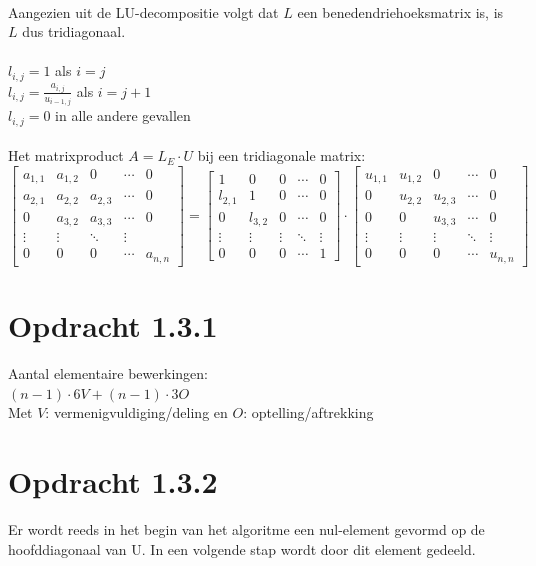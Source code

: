 \documentclass[a4paper]{article}
\begin{document}
\\Aangezien uit de LU-decompositie volgt dat $L$ een benedendriehoeksmatrix is, is $L$ dus tridiagonaal.
\\{}
\\$l_{i,j} = 1$ als $i=j$
\\$l_{i,j} = \frac{a_{i,j}}{u_{i-1,j}}$ als $i=j+1$
\\ $l_{i,j} = 0$ in alle andere gevallen
\\{}
\\ \textbullet { }Het matrixproduct  $A=L_{E}\cdot U$ bij een tridiagonale matrix:
\[
 \begin{bmatrix}
  a_{1,1} & a_{1,2}& 0 & \cdots &0 \\
  a_{2,1} & a_{2,2}&a_{2,3} & \cdots &0 \\
 0 & a_{3,2}&a_{3,3} & \cdots &0 \\
  \vdots  & \vdots  & \ddots & \vdots  \\
 0 & 0 &0 & \cdots & a_{n,n} 
 \end{bmatrix}
=
\begin{bmatrix}
 1 & 0 & 0& \cdots & 0 \\
  l_{2,1} &1 &0& \cdots &0 \\
0 &l_{3,2} &0& \cdots &0 \\
    \vdots  &\vdots  & \vdots  & \ddots & \vdots  \\
0 &0&0 & \cdots & 1 
\end{bmatrix}
\cdot
\begin{bmatrix}
  u_{1,1} & u_{1,2}&0& \cdots &0 \\
  0 & u_{2,2}&u_{2,3} & \cdots &0 \\
  0 & 0&u_{3,3} & \cdots &0 \\
   \vdots  & \vdots  & \vdots  & \ddots & \vdots  \\
 0 & 0 &0& \cdots & u_{n,n}
\end{bmatrix}
\]
%
%
%
%
%
%
\section*{Opdracht 1.3.1}
Aantal elementaire bewerkingen:
\\$(n-1) \cdot 6V + (n-1) \cdot 3O$
\\Met $V$: vermenigvuldiging/deling en $O$: optelling/aftrekking
%
%
%
%
%
%
\section*{Opdracht 1.3.2}
Er wordt reeds in het begin van het algoritme een nul-element gevormd op de hoofddiagonaal van U. In een volgende stap wordt door dit element gedeeld.
\end{document}
